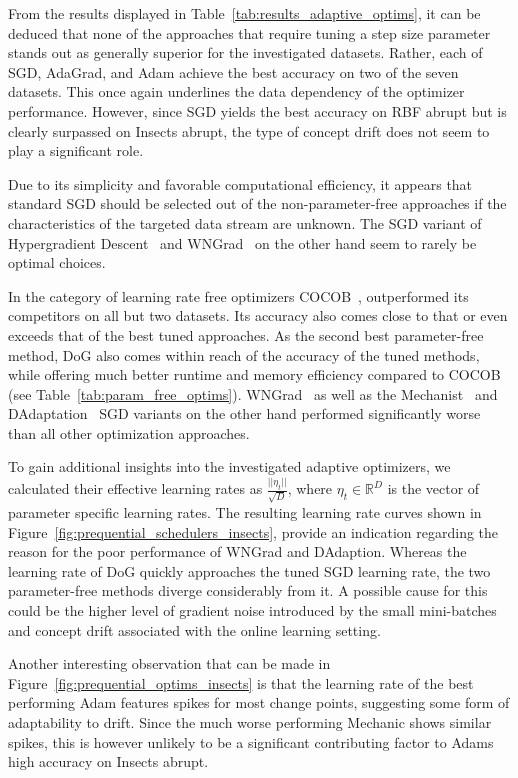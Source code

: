 \documentclass[letterpaper]{article} %
\begin{document}
From the results displayed in Table~\ref{tab:results_adaptive_optims}, it can be deduced that none of the approaches that require tuning a step size parameter stands out as generally superior for the investigated datasets.
Rather, each of SGD, AdaGrad, and Adam achieve the best accuracy on two of the seven datasets.  This once again underlines the data dependency of the optimizer performance.
However, since SGD yields the best accuracy on RBF abrupt but is clearly surpassed on Insects abrupt, the type of concept drift does not seem to play a significant role.

Due to its simplicity and favorable computational efficiency, it appears that standard SGD should be selected out of the non-parameter-free approaches if the characteristics of the targeted data stream are unknown.
The SGD variant of Hypergradient Descent~\cite{baydinOnlineLearningRate2018} and WNGrad~\cite{wuWNGradLearnLearning2020} on the other hand seem to rarely be optimal choices.

In the category of learning rate free optimizers COCOB~\cite{orabonaTrainingDeepNetworks2017}, outperformed its competitors on all but two datasets.
Its accuracy also comes close to that or even exceeds that of the best tuned approaches.
As the second best parameter-free method, DoG also comes within reach of the accuracy of the tuned methods, while offering much better runtime and memory efficiency compared to COCOB (see Table~\ref{tab:param_free_optims}).
WNGrad~\cite{wuWNGradLearnLearning2020} as well as the Mechanist~\cite{cutkoskyMechanicLearningRate2023} and DAdaptation~\cite{defazioLearningRateFreeLearningDAdaptation2023a} SGD variants on the other hand performed significantly worse than all other optimization approaches.

To gain additional insights into the investigated adaptive optimizers, we calculated their effective learning rates as $\frac{||\eta_t||}{\sqrt{D}}$, where $\eta_t \in \mathbb{R}^D$ is the vector of parameter specific learning rates.
The resulting learning rate curves shown in Figure~\ref{fig:prequential_schedulers_insects}, provide an indication regarding the reason for the poor performance of WNGrad and DAdaption.
Whereas the learning rate of DoG quickly approaches the tuned SGD learning rate, the two parameter-free methods diverge considerably from it.
A possible cause for this could be the higher level of gradient noise introduced by the small mini-batches and concept drift associated with the online learning setting.

Another interesting observation that can be made in Figure~\ref{fig:prequential_optims_insects} is that the learning rate of the best performing Adam features spikes for most change points, suggesting some form of adaptability to drift.
Since the much worse performing Mechanic shows similar spikes, this is however unlikely to be a significant contributing factor to Adams high accuracy on Insects abrupt.
\end{document}

